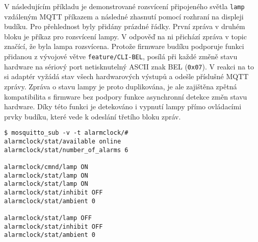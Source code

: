 V následujícím příkladu je demonstrované rozsvícení připojeného světla
\texttt{lamp} vzdáleným MQTT příkazem a následné zhasnutí pomocí rozhraní na
displeji budíku. Pro přehlednost byly přidány prázdné řádky. První zpráva
v druhém bloku je příkaz pro rozsvícení lampy. V odpověď na ni přichází zpráva
v topic  značící, že byla lampa rozsvícena. Protože
firmware budíku podporuje funkci přidanou z vývojové větve
\texttt{feature/CLI-BEL}, posílá při každé změně stavu hardware na sériový port
netisknutelný ASCII znak BEL (\texttt{0x07}). V reakci na to si adaptér vyžádá
stav všech hardwarových výstupů a odešle příslušné MQTT zprávy. Zpráva o stavu
lampy je proto duplikována, je ale zajištěna zpětná kompatibilita s firmware
bez podpory funkce asynchronní detekce změn stavu hardware.
Díky této funkci je detekováno i vypnutí lampy přímo ovládacími prvky budíku,
které vede k odeslání třetího bloku zpráv.
\begin{lstlisting}[style=terminal]
$ mosquitto_sub -v -t alarmclock/#
alarmclock/stat/available online
alarmclock/stat/number_of_alarms 6

alarmclock/cmnd/lamp ON
alarmclock/stat/lamp ON
alarmclock/stat/lamp ON
alarmclock/stat/inhibit OFF
alarmclock/stat/ambient 0

alarmclock/stat/lamp OFF
alarmclock/stat/inhibit OFF
alarmclock/stat/ambient 0
\end{lstlisting}

